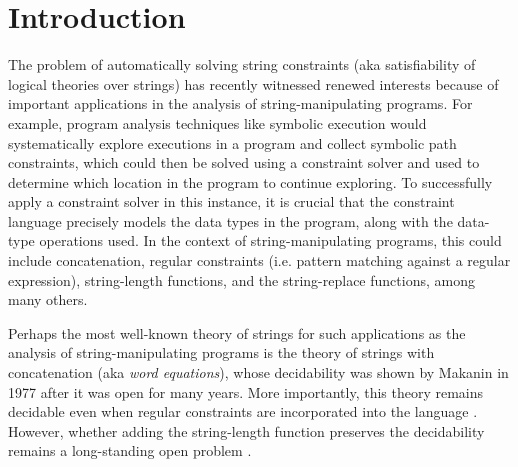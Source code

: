 
\section{Introduction}
\label{sec:intro}

The problem of %
automatically solving string constraints (aka satisfiability of logical theories over
strings) has recently witnessed renewed interests %
\cite{Berkeley-JavaScript,TCJ16,LB16,YABI14,S3,Abdulla14,Abdulla17,DV13,symbolic-transducer,BEK,HAMPI,cvc4,Z3-str,fang-yu-circuits,BTV09} 
because of important applications in the analysis of string-manipulating  programs. For example,
program analysis techniques like symbolic execution
\cite{king76,DART,EXE,jalangi} 
would
systematically explore executions in a program and collect symbolic path 
constraints, which could then be solved using a constraint solver and
used to determine which location in the program to continue exploring.
To successfully apply a constraint solver in this instance, it is
crucial that the constraint language precisely models the data types in the
program, along with the data-type operations used. In the context of
string-manipulating programs, this could include 
concatenation, regular constraints (i.e. pattern matching against a regular
expression), string-length functions, and the string-replace functions, among 
many others.

Perhaps the most well-known theory of strings for such applications as the
analysis of string-manipulating programs is the theory of strings with concatenation  (aka \emph{word equations}), whose decidability was shown by Makanin \cite{Makanin} in 1977 after it was open for many years. More importantly, 
this theory remains decidable even when regular constraints are incorporated into the 
language \cite{Schulz}. However, whether adding the string-length function
 preserves the decidability remains a long-standing open problem
\cite{Vijay-length,buchi}. 

